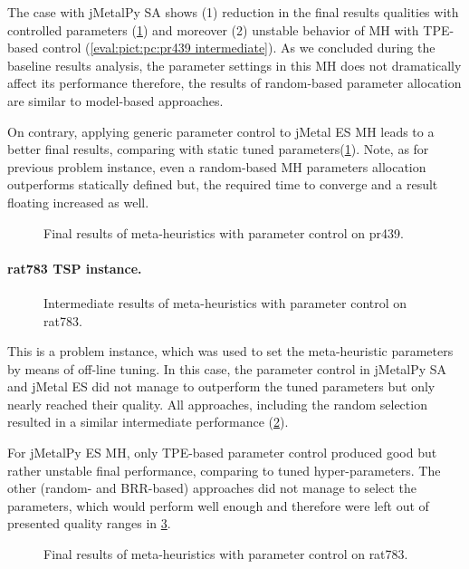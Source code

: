 The case with jMetalPy SA shows (1) reduction in the final results qualities with controlled parameters (\cref{eval:pict:pc:pr439 final}) and moreover (2) unstable behavior of MH with TPE-based control (\cref{eval:pict:pc:pr439 intermediate}). As we concluded during the baseline results analysis, the parameter settings in this MH does not dramatically affect its performance therefore, the results of random-based parameter allocation are similar to model-based approaches.

On contrary, applying generic parameter control to jMetal ES MH leads to a better final results, comparing with static tuned parameters(\cref{eval:pict:pc:pr439 final}). Note, as for previous problem instance, even a random-based MH parameters allocation outperforms statically defined but, the required time to converge and a result floating increased as well. 
\begin{figure}[b]
	\centering
	
	\caption{Final results of meta-heuristics with parameter control on pr439.}
	\label{eval:pict:pc:pr439 final}
\end{figure}

\newpage
\paragraph{rat783 TSP instance.}
\begin{figure}[t]
	\centering
	
	\caption{Intermediate results of meta-heuristics with parameter control on rat783.}
	\label{eval:pict:pc:rat783 intermediate}
\end{figure}

This is a problem instance, which was used to set the meta-heuristic parameters by means of off-line tuning. In this case, the parameter control in jMetalPy SA and jMetal ES did not manage to outperform the tuned parameters but only nearly reached their quality. All approaches, including the random selection resulted in a similar intermediate performance (\cref{eval:pict:pc:rat783 intermediate}).

For jMetalPy ES MH, only TPE-based parameter control produced good but rather unstable final performance, comparing to tuned hyper-parameters. The other (random- and BRR-based) approaches did not manage to select the parameters, which would perform well enough and therefore were left out of presented quality ranges in \cref{eval:pict:pc:rat783 final}.

\begin{figure}[b]
	\centering
	
	\caption{Final results of meta-heuristics with parameter control on rat783.}
	\label{eval:pict:pc:rat783 final}
\end{figure}

